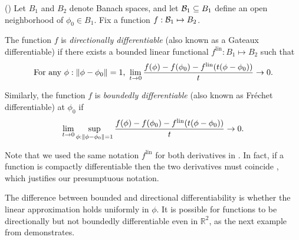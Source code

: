 \begin{defn}
    (\citep[Definition 4.5]{zeidler:2013:functional})
%
Let $B_1$ and $B_2$ denote Banach spaces, and let $\mathcal{B}_1 \subseteq B_1$ define
an open neighborhood of $\phi_0 \in B_1$.  Fix a function $f: \mathcal{B}_1
\mapsto B_2$.

The function $f$ is {\em directionally differentiable} (also known as a Gateaux
differentiable) if there exists a bounded linear functional $f^{\mathrm{lin}}:
B_1 \mapsto B_2$ such that
%
\begin{align*}
%
\textrm{For any }\phi: \norm{\phi - \phi_0} = 1\textrm{, }
\lim_{t \rightarrow 0}
    \frac{f(\phi) - f(\phi_0) -
          f^{\mathrm{lin}}(t (\phi - \phi_0) )
         }{t} \rightarrow 0.
%
\end{align*}
%

Similarly, the function $f$ is {\em boundedly differentiable} (also known as
Fr{\'echet} differentiable) at $\phi_0$ if
%
\begin{align*}
%
\lim_{t \rightarrow 0}
    \sup_{\phi: \norm{\phi - \phi_0} = 1}
    \frac{f(\phi) - f(\phi_0) -
          f^{\mathrm{lin}}(t (\phi - \phi_0))
         }{t} \rightarrow 0.
%
\end{align*}
%
\end{defn}

Note that we used the same notation $f^{\mathrm{lin}}$ for both derivatives in
.  In fact, if a function is compactly differentiable
then the two derivatives must coincide \citep[Proposition
4.8]{zeidler:2013:functional}, which justifies our presumptuous notation.

The difference between bounded and directional differentiability is whether the
linear approximation holds uniformly in $\phi$.  It is possible for functions to
be directionally but not boundedly differentiable even in $\mathbb{R}^2$, as the
next example from \citet{averbukh:1967:theory} demonstrates.

